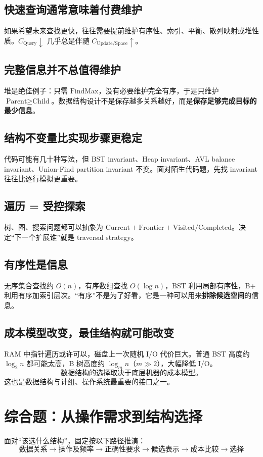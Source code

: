 \documentclass[11pt,a4paper,openany]{ctexbook}
\newcommand{\key}[1]{\textbf{\color{deep}#1}}
\begin{document}
\subsection{快速查询通常意味着付费维护}
如果希望未来查找更快，往往需要提前维护有序性、索引、平衡、散列映射或堆性质。$C_{\text{Query}}\downarrow$ 几乎总是伴随 $C_{\text{Update/Space}}\uparrow$。

\subsection{完整信息并不总值得维护}
堆是绝佳例子：只需 $\text{FindMax}$，没有必要维护完全有序，于是只维护 $\text{Parent}\ge\text{Child}$。数据结构设计不是保存越多关系越好，而是\key{保存足够完成目标的最少信息}。

\subsection{结构不变量比实现步骤更稳定}
代码可能有几十种写法，但 BST invariant、Heap invariant、AVL balance invariant、Union-Find partition invariant 不变。面对陌生代码题，先找 invariant 往往比逐行模拟更重要。

\subsection{遍历 = 受控探索}
树、图、搜索问题都可以抽象为 $\text{Current}+\text{Frontier}+\text{Visited/Completed}$。决定“下一个扩展谁”就是 traversal strategy。

\subsection{有序性是信息}
无序集合查找约 $O(n)$，有序数组查找 $O(\log n)$，BST 利用局部有序性，B+ 利用有序加索引层次。“有序”不是为了好看，它是一种可以用来\key{排除候选空间}的信息。

\subsection{成本模型改变，最佳结构就可能改变}
RAM 中指针遍历或许可以，磁盘上一次随机 I/O 代价巨大。普通 BST 高度约 $\log_2 n$ 都可能太高，B 树高度约 $\log_m n$（$m\gg 2$），大幅降低 I/O。
\[
\boxed{\text{数据结构的选择取决于底层机器的成本模型。}}
\]
这也是数据结构与计组、操作系统最重要的接口之一。

\section{综合题：从操作需求到结构选择}
面对“该选什么结构”，固定按以下路径推演：
\[
\boxed{\text{数据关系}\rightarrow\text{操作及频率}\rightarrow\text{正确性要求}\rightarrow\text{候选表示}\rightarrow\text{成本比较}\rightarrow\text{选择}}
\]
\end{document}

